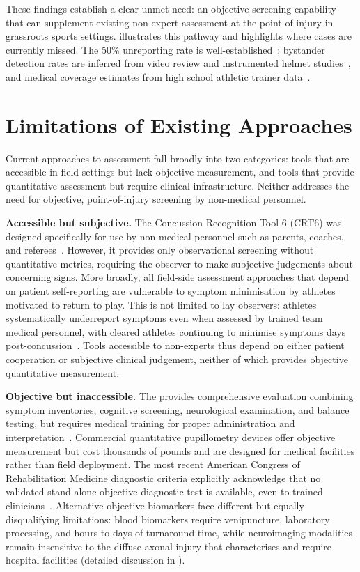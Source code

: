 These findings establish a clear unmet need: an objective screening capability that can supplement existing non-expert assessment at the point of injury in grassroots sports settings.  illustrates this pathway and highlights where cases are currently missed. The 50\% unreporting rate is well-established~\cite{mccrea2004unreported}; bystander detection rates are inferred from video review and instrumented helmet studies~\cite{echlin2010sideline, beckwith2013impacts}, and medical coverage estimates from high school athletic trainer data~\cite{pryor2015athletic}.


\section{Limitations of Existing Approaches}
\label{chapter:introduction:limitations}

Current approaches to  assessment fall broadly into two categories: tools that are accessible in field settings but lack objective measurement, and tools that provide quantitative assessment but require clinical infrastructure. Neither addresses the need for objective, point-of-injury screening by non-medical personnel.

\textbf{Accessible but subjective.} The Concussion Recognition Tool 6 (CRT6) was designed specifically for use by non-medical personnel such as parents, coaches, and referees~\cite{echemendia2023crt6}. However, it provides only observational screening without quantitative metrics, requiring the observer to make subjective judgements about concerning signs. More broadly, all field-side assessment approaches that depend on patient self-reporting are vulnerable to symptom minimisation by athletes motivated to return to play. This is not limited to lay observers: athletes systematically underreport symptoms even when assessed by trained team medical personnel, with cleared athletes continuing to minimise symptoms days post-concussion~\cite{meier2015underreporting}. Tools accessible to non-experts thus depend on either patient cooperation or subjective clinical judgement, neither of which provides objective quantitative measurement.

\textbf{Objective but inaccessible.} The  provides comprehensive evaluation combining symptom inventories, cognitive screening, neurological examination, and balance testing, but requires medical training for proper administration and interpretation~\cite{echemendia2023scat6}. Commercial quantitative pupillometry devices offer objective measurement but cost thousands of pounds and are designed for medical facilities rather than field deployment. The most recent American Congress of Rehabilitation Medicine diagnostic criteria explicitly acknowledge that no validated stand-alone objective diagnostic test is available, even to trained clinicians~\cite{silverberg2023acrm}. Alternative objective biomarkers face different but equally disqualifying limitations: blood biomarkers require venipuncture, laboratory processing, and hours to days of turnaround time, while neuroimaging modalities remain insensitive to the diffuse axonal injury that characterises  and require hospital facilities (detailed discussion in ).

